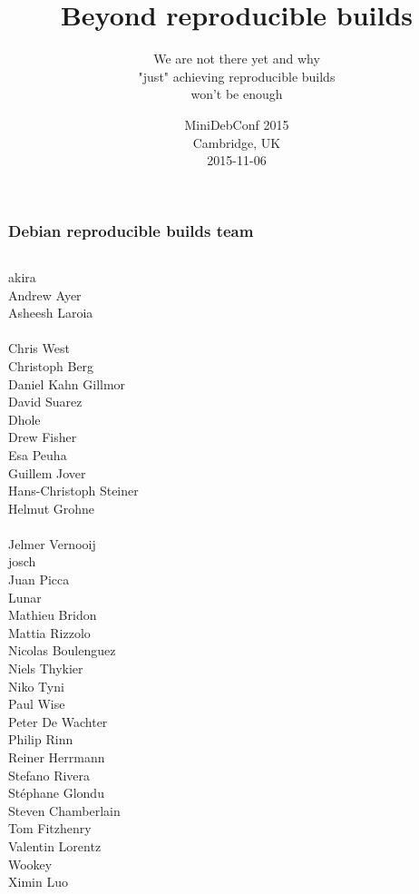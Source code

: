 \documentclass[14pt]{beamer}
\title[Reproducible builds]{Beyond reproducible builds}
\subtitle{We are not there yet and why \\ "just" achieving reproducible builds
\\ won't be enough}
\author[lamby \& h01ger]{%
   \texorpdfstring{
        \begin{columns}
            \column{.45\linewidth}
            \centering
            Chris Lamb (lamby) \\
            \href{mailto:lamby@debian.org}{lamby@debian.org}
            \column{.45\linewidth}
            \centering
            Holger 'h01ger' Levsen\\
            \href{mailto:holger@debian.org}{holger@debian.org}
        \end{columns}
   }{lamby \& h01ger}}
\institute[Debian]{}
\date[MiniDebConf Cambridge '15]{%
 MiniDebConf 2015\\
 Cambridge, UK\\
 2015-11-06}
\begin{document}
\begin{frame}
 \titlepage
\end{frame}

\begin{frame}
 \frametitle{Debian reproducible builds team}
 \begin{center}
  \begin{columns}
   \small
    {akira} \\
    {Andrew Ayer} \\
    {Asheesh Laroia} \\
     \\
    {Chris West} \\
    {Christoph Berg} \\
    {Daniel Kahn Gillmor} \\
    David Suarez \\
    {Dhole} \\
    Drew Fisher \\
    Esa Peuha \\
    {Guillem Jover} \\
    Hans-Christoph Steiner \\
    {Helmut Grohne} \\
     \\
    Jelmer Vernooij \\
    {josch} \\
    Juan Picca \\
    {Lunar} \\
    Mathieu Bridon \\
    {Mattia Rizzolo} \\
    Nicolas Boulenguez \\
    {Niels Thykier} \\
    Niko Tyni \\
    {Paul Wise} \\
    Peter De Wachter \\
    Philip Rinn \\
    {Reiner Herrmann} \\
    {Stefano Rivera} \\
    {Stéphane Glondu} \\
    {Steven Chamberlain} \\
    Tom Fitzhenry \\
    Valentin Lorentz \\
    {Wookey} \\
    {Ximin Luo} \\
  \end{columns}
 \end{center}
\end{frame}
\end{document}
